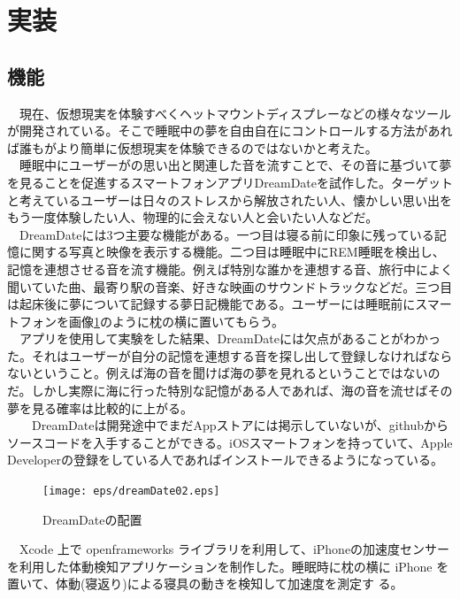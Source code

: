 \section{実装}
\subsection{機能}
　現在、仮想現実を体験すべくヘットマウントディスプレーなどの様々なツールが開発されている。そこで睡眠中の夢を自由自在にコントロールする方法があれば誰もがより簡単に仮想現実を体験できるのではないかと考えた。\\
　睡眠中にユーザーがの思い出と関連した音を流すことで、その音に基づいて夢を見ることを促進するスマートフォンアプリDreamDateを試作した。ターゲットと考えているユーザーは日々のストレスから解放されたい人、懐かしい思い出をもう一度体験したい人、物理的に会えない人と会いたい人などだ。\\
　DreamDateには3つ主要な機能がある。一つ目は寝る前に印象に残っている記憶に関する写真と映像を表示する機能。二つ目は睡眠中にREM睡眠を検出し、記憶を連想させる音を流す機能。例えば特別な誰かを連想する音、旅行中によく聞いていた曲、最寄り駅の音楽、好きな映画のサウンドトラックなどだ。三つ目は起床後に夢について記録する夢日記機能である。ユーザーには睡眠前にスマートフォンを画像\ref{DreamDateImage}のように枕の横に置いてもらう。\\
　アプリを使用して実験をした結果、DreamDateには欠点があることがわかった。それはユーザーが自分の記憶を連想する音を探し出して登録しなければならないということ。例えば海の音を聞けば海の夢を見れるということではないのだ。しかし実際に海に行った特別な記憶がある人であれば、海の音を流せばその夢を見る確率は比較的に上がる。\\
　　DreamDateは開発途中でまだAppストアには掲示していないが、githubからソースコードを入手することができる。iOSスマートフォンを持っていて、Apple Developerの登録をしている人であればインストールできるようになっている。

\begin{figure}[htbp]
\begin{center}
\texttt{[image: eps/dreamDate02.eps]}
\caption{DreamDateの配置}
\label{DreamDateImage}
\end{center}
\end{figure}


　Xcode 上で openframeworks ライブラリを利用して、iPhoneの加速度センサーを利用した体動検知アプリケーションを制作した。睡眠時に枕の横に iPhone を置いて、体動(寝返り)による寝具の動きを検知して加速度を測定す る。\\

